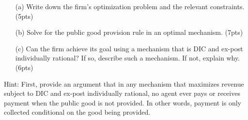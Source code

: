 \documentclass[10pt,a4paper]{article}
\begin{document}
  \begin{enumerate}
      \item[(a)] Write down the firm's optimization problem and the relevant constraints. (5pts)
      \item[(b)] Solve for the public good provision rule in an optimal mechanism. (7pts)
      \item[(c)] Can the firm achieve its goal using a mechanism that is DIC and ex-post individually rational? If so, describe such a mechanism. If not, explain why. (6pts)
  \end{enumerate}

  Hint: First, provide an argument that in any mechanism that maximizes revenue subject to DIC and ex-post individually rational, no agent ever pays or receives payment when the public good is not provided. In other words, payment is only collected conditional on the good being provided.
\end{document}
